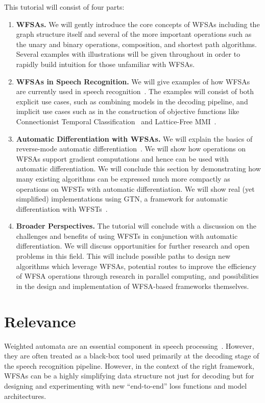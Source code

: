 \documentclass[11pt]{article}
\begin{document}
This tutorial will consist of four parts:
\vspace{-10pt}
\begin{enumerate}
  \item {\bf WFSAs.} We will gently introduce the core concepts of WFSAs
    including the graph structure itself and several of the more important
    operations such as the unary and binary operations, composition, and
    shortest path algorithms. Several examples with illustrations will be given
    throughout in order to rapidly build intuition for those unfamiliar with
    WFSAs.

  \item {\bf WFSAs in Speech Recognition.} We will give examples of how WFSAs
    are currently used in speech recognition~\cite{mohri2002weighted}. The
    examples will consist of both explicit use cases, such as combining models
    in the decoding pipeline, and implicit use cases such as in the
    construction of objective functions like Connectionist Temporal
    Classification~\cite{graves2006} and Lattice-Free
    MMI~\cite{povey2016purely}.

  \item {\bf Automatic Differentiation with WFSAs.} We will explain the basics
    of reverse-mode automatic differentiation~\cite{baydin2018automatic}.  We
    will show how operations on WFSAs support gradient computations and hence
    can be used with automatic differentiation. We will conclude this section
    by demonstrating how many existing algorithms can be expressed much more
    compactly as operations on WFSTs with automatic differentiation. We will
    show real (yet simplified) implementations using GTN, a framework for
    automatic differentiation with WFSTs~\cite{gtn}.

  \item {\bf Broader Perspectives.} The tutorial will conclude with a
    discussion on the challenges and benefits of using WFSTs in conjunction
    with automatic differentiation. We will discuss opportunities for further
    research and open problems in this field. This will include possible paths
    to design new algorithms which leverage WFSAs, potential routes to improve
    the efficiency of WFSA operations through research in parallel computing,
    and possibilities in the design and implementation of WFSA-based frameworks
    themselves.
\end{enumerate}

\section*{Relevance}
Weighted automata are an essential component in speech
processing~\cite{mohri2002weighted}. However, they are often treated as a
black-box tool used primarily at the decoding stage of the speech recognition
pipeline. However, in the context of the right framework, WFSAs can be a highly
simplifying data structure not just for decoding but for designing and
experimenting with new ``end-to-end'' loss functions and model architectures.
\end{document}

